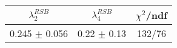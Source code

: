 \begin{tabular}{c|c||c}
$\lambda_{2}^{RSB}$ & $\lambda_4^{RSB}$ & $\chi^{2}$/ndf \\
\hline
0.245 $\pm$ 0.056 & 0.22 $\pm$ 0.13 & 132/76\\
\end{tabular}
